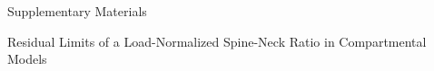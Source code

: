 \newcommand{\spinenatbiboptions}{numbers,sort&compress}
\newcommand{\spinebibstyle}{unsrtnat}
\newif\ifblind
\blindfalse




\begin{center}
{\Large Supplementary Materials}\\[0.5em]
\begin{minipage}{0.9\textwidth}
\centering
{\large Residual Limits of a Load-Normalized Spine-Neck Ratio in Compartmental Models}
\end{minipage}
\end{center}













